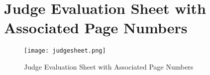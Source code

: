 \section{Judge Evaluation Sheet with Associated Page Numbers}
\begin{figure}[H]
    \centering
    \texttt{[image: judgesheet.png]}
    \vspace{-7cm}
    \caption{Judge Evaluation Sheet with Associated Page Numbers}
  \end{figure}